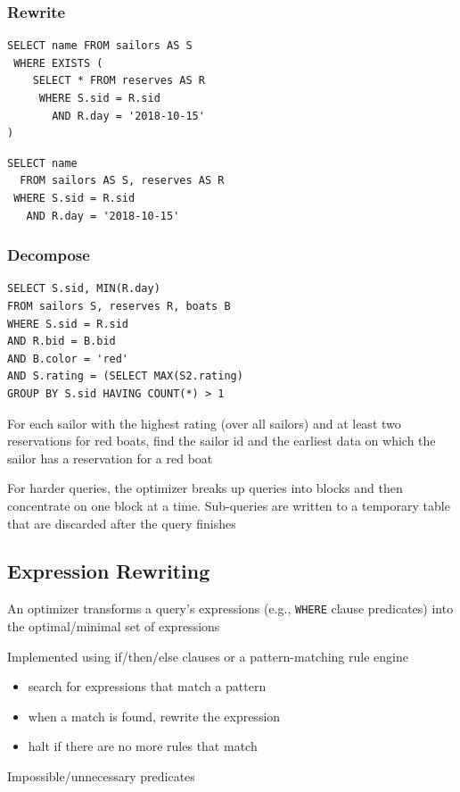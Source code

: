 \documentclass[11pt]{article}
\begin{document}
\subsubsection{Rewrite}
\label{sec:org0c4f58b}
\begin{verbatim}
SELECT name FROM sailors AS S
 WHERE EXISTS (
    SELECT * FROM reserves AS R
     WHERE S.sid = R.sid
       AND R.day = '2018-10-15'
)
\end{verbatim}

\begin{verbatim}
SELECT name
  FROM sailors AS S, reserves AS R
 WHERE S.sid = R.sid
   AND R.day = '2018-10-15'
\end{verbatim}
\subsubsection{Decompose}
\label{sec:org33683ec}
\begin{verbatim}
SELECT S.sid, MIN(R.day)
FROM sailors S, reserves R, boats B
WHERE S.sid = R.sid
AND R.bid = B.bid
AND B.color = 'red'
AND S.rating = (SELECT MAX(S2.rating)
GROUP BY S.sid HAVING COUNT(*) > 1
\end{verbatim}
For each sailor with the highest rating (over all sailors) and at least two reservations for red
boats, find the sailor id and the earliest data on which the sailor has a reservation for a red
boat

For harder queries, the optimizer breaks up queries into blocks and then concentrate on one
block at a time. Sub-queries are written to a temporary table that are discarded after the query finishes
\subsection{Expression Rewriting}
\label{sec:org83f8a45}
An optimizer transforms a query's expressions (e.g., \texttt{WHERE} clause predicates) into the
optimal/minimal set of expressions

Implemented using if/then/else clauses or a pattern-matching rule engine
\begin{itemize}
\item search for expressions that match a pattern
\item when a match is found, rewrite the expression
\item halt if there are no more rules that match
\end{itemize}

Impossible/unnecessary predicates
\end{document}
